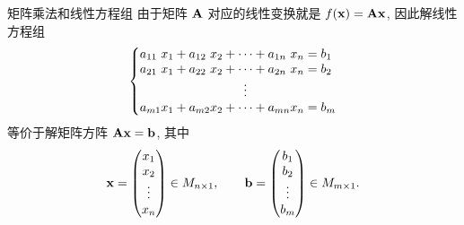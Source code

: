 \begin{frame}{矩阵乘法和线性方程组}
	\onslide<+->
	由于矩阵 ${\mathbf{A}}$ 对应的线性变换就是 $f({\mathbf{x}})={\mathbf{A}}{\mathbf{x}}$,
	\onslide<+->
	因此解线性方程组
	\[\laeq[lclcclcl]{
		a_{11}&x_1+{}&a_{12}&x_2&{}+\cdots+{}&a_{1n}&x_n={}&b_1\\
		a_{21}&x_1+{}&a_{22}&x_2&{}+\cdots+{}&a_{2n}&x_n={}&b_2\\
		&&&&\vdots&&&\\
		a_{m1}&x_1+{}&a_{m2}&x_2&{}+\cdots+{}&a_{mn}&x_n={}&b_m
	}\]
	等价于解矩阵方阵 \alert{${\mathbf{A}}{\mathbf{x}}={\mathbf{b}}$}, 其中
	\[{\mathbf{x}}=\begin{pmatrix}
		x_1\\x_2\\\vdots\\x_n
	\end{pmatrix}\in M_{n\times 1},\qquad
	{\mathbf{b}}=\begin{pmatrix}
		b_1\\b_2\\\vdots\\b_m
	\end{pmatrix}\in M_{m\times 1}.\]
\end{frame}


